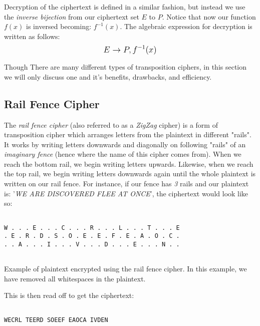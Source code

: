 Decryption of the ciphertext is defined in a similar fashion, but instead we use the \textit{inverse bijection} from our ciphertext set $E$ to $P$. 
Notice that now our function $f(x)$ is inversed becoming: $f^{-1}(x)$. The algebraic expression for decryption is written as follows: 
$$\mathlarger{E \rightarrow P, f^{-1}(x)}$$

Though There are many different types of transposition ciphers, in this section we will only discuss one and it's benefits, drawbacks, and efficiency.

\subsection{Rail Fence Cipher}

The \textit{rail fence cipher} (also referred to as a \textit{ZigZag} cipher) is a form of transposition cipher which arranges letters from
the plaintext in different "rails". It works by writing letters downwards and diagonally on following "rails" of an 
\textit{imaginary fence} (hence where the name of this cipher comes from). When we reach the bottom rail, we begin writing 
letters upwards. Likewise, when we reach the top rail, we begin writing letters downwards again until the whole plaintext is
written on our rail fence. For instance, if our fence has \textit{3} rails and our plaintext is:
'\textit{WE ARE DISCOVERED FLEE AT ONCE}', the ciphertext would look like so:

\begin{listing}[H]
    \begin{verbatim}
    
W . . . E . . . C . . . R . . . L . . . T . . . E
. E . R . D . S . O . E . E . F . E . A . O . C .
. . A . . . I . . . V . . . D . . . E . . . N . .
    
    \end{verbatim}
    \caption{Example of plaintext encrypted using the rail fence cipher. In this example, we have removed
    all whitespaces in the plaintext.}
\end{listing}

This is then read off to get the ciphertext:

\begin{verbatim}
    
WECRL TEERD SOEEF EAOCA IVDEN
\end{verbatim}

